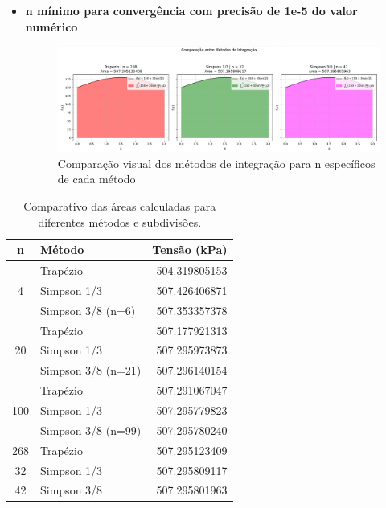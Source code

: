 \documentclass{article}
\begin{document}
\begin{itemize}
    \item \textbf{n mínimo para convergência com precisão de 1e-5 do valor numérico}
    \begin{figure}[H]
        \centering
        \includegraphics[width=1\textwidth, height=0.3\textheight, keepaspectratio]{n_min.png}
        \caption{Comparação visual dos métodos de integração para n específicos de cada método}\label{fig:n_min}
    \end{figure}
\end{itemize}

\begin{table}[htbp]
    \centering
    \caption{Comparativo das áreas calculadas para diferentes métodos e subdivisões.}\label{tab:resultados_agrupados}
    \begin{tabular}{c l r}
        \toprule
        \textbf{n} & \textbf{Método} & \textbf{ Tensão (kPa) } \\
        \midrule
        \multirow{3}{*}{4} 
        & Trapézio & 504.319805153 \\
        & Simpson 1/3 & 507.426406871 \\
        & Simpson 3/8 (n=6) & 507.353357378 \\
        \midrule
        \multirow{3}{*}{20} 
        & Trapézio & 507.177921313 \\
        & Simpson 1/3 & 507.295973873 \\
        & Simpson 3/8 (n=21) & 507.296140154 \\
        \midrule
        \multirow{3}{*}{100} 
        & Trapézio & 507.291067047 \\
        & Simpson 1/3 & 507.295779823 \\
        & Simpson 3/8 (n=99) & 507.295780240 \\
        \midrule
        268 & Trapézio & 507.295123409 \\
        32 & Simpson 1/3 & 507.295809117 \\
        42 & Simpson 3/8 & 507.295801963 \\
        \bottomrule
    \end{tabular}
\end{table}
\vspace{2cm}
\end{document}
